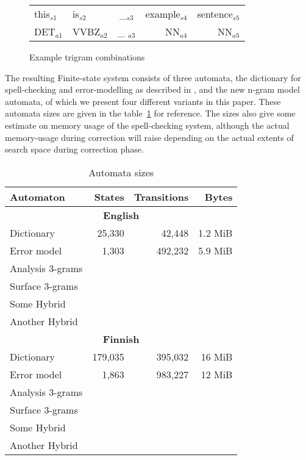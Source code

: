 \documentclass[11pt,a4paper]{article}
\begin{document}
\begin{figure}[h]
\begin{centering}
\caption{Example trigram combinations\label{fig:example}}
\begin{scriptsize}
\begin{tabular}{llcrr}
\hline
this$_{s1}$ & is$_{s2}$ & \_$_{s3}$ & example$_{s4}$ & sentence$_{s5}$\\
DET$_{a1}$ & VVBZ$_{a2}$ & \_ $_{a3}$& NN$_{a4}$ & NN$_{a5}$\\
\hline
\end{tabular}
\end{scriptsize}
\end{centering}
\end{figure}

The resulting Finite-state system consists of three automata, the dictionary
for spell-checking and error-modelling as described in
\cite{pirinen/2010/lrec}, and the new n-gram model automata, of which
we present four different variants in this paper. These automata sizes are given
in the table~\ref{table:sizes} for reference. The sizes also give some estimate
on memory usage of the spell-checking system, although the actual memory-usage
during correction will raise depending on the actual extents of search space
during correction phase.

\begin{table}
\begin{centering}
\caption{Automata sizes\label{table:sizes}}
\begin{scriptsize}
\begin{tabular}{lrrr}
    Automaton & States & Transitions & Bytes \\
    \hline
    \multicolumn{4}{c}{\textbf{English}} \\
    \hline
    Dictionary & 25,330 & 42,448 & 1.2 MiB \\
    Error model & 1,303 & 492,232 & 5.9 MiB \\
    \hline
    Analysis 3-grams & & & \\
    Surface 3-grams & & & \\
    Some Hybrid & & & \\
    Another Hybrid & & & \\
    \hline
    \multicolumn{4}{c}{\textbf{Finnish}} \\
    \hline
    Dictionary & 179,035 & 395,032 & 16 MiB \\
    Error model & 1,863 & 983,227 & 12 MiB \\
    \hline
    Analysis 3-grams & & & \\
    Surface 3-grams & & & \\
    Some Hybrid & & & \\
    Another Hybrid & & & \\
    \hline
\end{tabular}
\end{scriptsize}
\end{centering}
\end{table}
\end{document}
